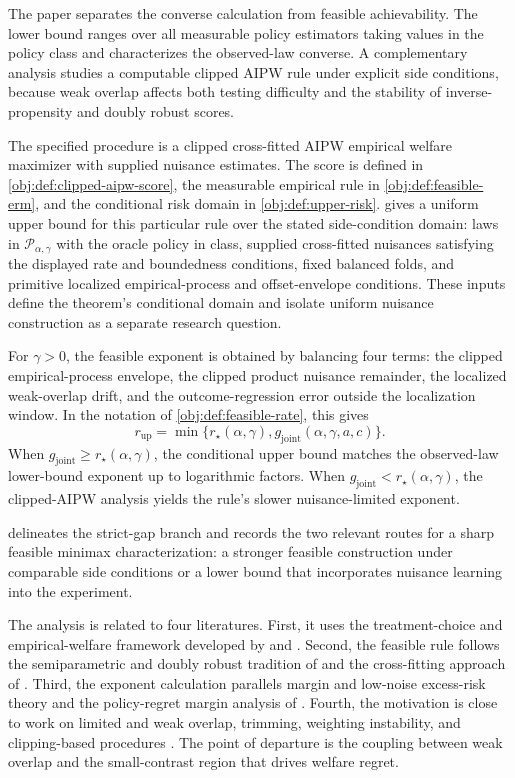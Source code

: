 \documentclass[11pt]{article}
\begin{document}
The paper separates the converse calculation from feasible achievability.  The lower bound ranges over all measurable policy estimators taking values in the policy class and characterizes the observed-law converse.  A complementary analysis studies a computable clipped AIPW rule under explicit side conditions, because weak overlap affects both testing difficulty and the stability of inverse-propensity and doubly robust scores.

The specified procedure is a clipped cross-fitted AIPW empirical welfare maximizer with supplied nuisance estimates.  The score is defined in \cref{obj:def:clipped-aipw-score}, the measurable empirical rule in \cref{obj:def:feasible-erm}, and the conditional risk domain in \cref{obj:def:upper-risk}.   gives a uniform upper bound for this particular rule over the stated side-condition domain: laws in \(\mathcal P_{\alpha,\gamma}\) with the oracle policy in class, supplied cross-fitted nuisances satisfying the displayed rate and boundedness conditions, fixed balanced folds, and primitive localized empirical-process and offset-envelope conditions.  These inputs define the theorem's conditional domain and isolate uniform nuisance construction as a separate research question.

For \(\gamma>0\), the feasible exponent is obtained by balancing four terms: the clipped empirical-process envelope, the clipped product nuisance remainder, the localized weak-overlap drift, and the outcome-regression error outside the localization window.  In the notation of \cref{obj:def:feasible-rate}, this gives
\[
r_{\mathrm{up}}
=
\min\{r_\star(\alpha,\gamma),g_{\mathrm{joint}}(\alpha,\gamma,a,c)\}.
\]
When \(g_{\mathrm{joint}}\ge r_\star(\alpha,\gamma)\), the conditional upper bound matches the observed-law lower-bound exponent up to logarithmic factors.  When \(g_{\mathrm{joint}}<r_\star(\alpha,\gamma)\), the clipped-AIPW analysis yields the rule's slower nuisance-limited exponent.

 delineates the strict-gap branch and records the two relevant routes for a sharp feasible minimax characterization: a stronger feasible construction under comparable side conditions or a lower bound that incorporates nuisance learning into the experiment.

The analysis is related to four literatures.  First, it uses the treatment-choice and empirical-welfare framework developed by \citet{Manski2004,Manski2009,Stoye2009} and \citet{Kitagawa2018}.  Second, the feasible rule follows the semiparametric and doubly robust tradition of \citet{Robins1994,Hahn1998,Hirano2003,Newey1994,Bickel1993,VanDerLaan2011} and the cross-fitting approach of \citet{Chernozhukov2018,Chernozhukov2022}.  Third, the exponent calculation parallels margin and low-noise excess-risk theory \citep{Audibert2007,Massart2006,Tsybakov2009} and the policy-regret margin analysis of \citet{Luedtke2017}.  Fourth, the motivation is close to work on limited and weak overlap, trimming, weighting instability, and clipping-based procedures \citep{Li2016,DAmour2017,BenMichael2022,Hill2024,Susmann2025,Zhao2023,Liu2026}.  The point of departure is the coupling between weak overlap and the small-contrast region that drives welfare regret.
\end{document}
